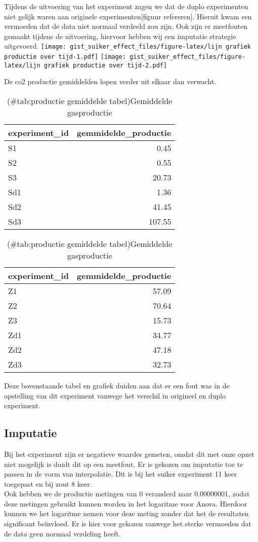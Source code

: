 \documentclass[
]{article}
\begin{document}
Tijdens de uitvoering van het experiment zagen we dat de duplo experimenten niet gelijk waren aan originele experimenten{[}figuur refereren{]}. Hieruit kwam een vermoeden dat de data niet normaal verdeeld zou zijn. Ook zijn er meetfouten gemaakt tijdens de uitvoering, hiervoor hebben wij een imputatie strategie uitgevoerd.
\texttt{[image: gist\_suiker\_effect\_files/figure-latex/lijn grafiek productie over tijd-1.pdf]} \texttt{[image: gist\_suiker\_effect\_files/figure-latex/lijn grafiek productie over tijd-2.pdf]}

De co2 productie gemiddelden lopen verder uit elkaar dan verwacht.

\begin{table}
\caption{(\#tab:productie gemiddelde tabel)Gemiddelde gasproductie}

\centering
\begin{tabular}[t]{l|r}
\hline
experiment\_id & gemmidelde\_productie\\
\hline
S1 & 0.45\\
\hline
S2 & 0.55\\
\hline
S3 & 20.73\\
\hline
Sd1 & 1.36\\
\hline
Sd2 & 41.45\\
\hline
Sd3 & 107.55\\
\hline
\end{tabular}
\centering
\begin{tabular}[t]{l|r}
\hline
experiment\_id & gemmidelde\_productie\\
\hline
Z1 & 57.09\\
\hline
Z2 & 70.64\\
\hline
Z3 & 15.73\\
\hline
Zd1 & 34.77\\
\hline
Zd2 & 47.18\\
\hline
Zd3 & 32.73\\
\hline
\end{tabular}
\end{table}

Deze bovenstaande tabel en grafiek duiden aan dat er een fout was in de opstelling van dit experiment vanwege het verschil in origineel en duplo experiment.

\subsection{Imputatie}\label{imputatie}

Bij het experiment zijn er negatieve waardes gemeten, omdat dit met onze opzet niet mogelijk is duidt dit op een meetfout. Er is gekozen om imputatie toe te passen in de vorm van interpolatie. Dit is bij het suiker experiment 11 keer toegepast en bij zout 8 keer.\\
Ook hebben we de productie metingen van 0 veranderd naar 0.00000001, zodat deze metingen gebruikt kunnen worden in het logaritme voor Anova. Hierdoor kunnen we het logaritme nemen voor deze meting zonder dat het de resultaten significant beïnvloed. Er is hier voor gekozen vanwege het sterke vermoeden dat de data geen normaal verdeling heeft.
\end{document}
